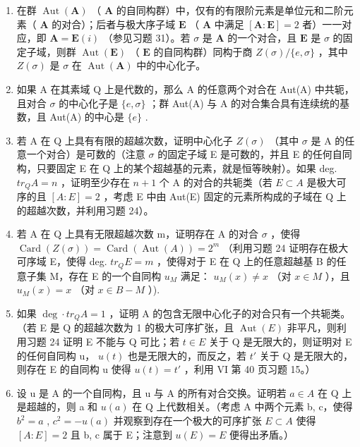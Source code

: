 \begin{enumerate}
\def\labelenumi{\alph{enumi})}
\item
  在群 \(\operatorname{Aut}(\mathbf{A})\) （ \(\mathbf{A}\) 的自同构群）中，仅有的有限阶元素是单位元和二阶元素（ \(\mathbf{A}\) 的对合）；后者与极大序子域 \(\mathbf{E}\) （ \(\mathbf{A}\) 中满足 \([\mathbf{A}:\mathbf{E}] = 2\) 者）一一对应，即 \(\mathbf{A} = \mathbf{E}(i)\) （参见习题 31）。若 \(\sigma\) 是 \(\mathbf{A}\) 的一个对合，且 \(\mathbf{E}\) 是 \(\sigma\) 的固定子域，则群 \(\operatorname{Aut}(\mathbf{E})\) （ \(\mathbf{E}\) 的自同构群）同构于商 \(Z(\sigma) / \{e, \sigma\}\) ，其中 \(Z(\sigma)\) 是 \(\sigma\) 在 \(\operatorname{Aut}(\mathbf{A})\) 中的中心化子。
\item
  如果 A 在其素域 Q 上是代数的，那么 A 的任意两个对合在 Aut(A) 中共轭，且对合 \(\sigma\) 的中心化子是 \(\{e, \sigma\}\) ；群 Aut(A) 与 A 的对合集合具有连续统的基数，且 Aut(A) 的中心是 \(\{e\}\) .
\item
  若 A 在 Q 上具有有限的超越次数，证明中心化子 \(Z(\sigma)\) （其中 \(\sigma\) 是 A 的任意一个对合）是可数的（注意 \(\sigma\) 的固定子域 E 是可数的，并且 E 的任何自同构，只要固定 E 在 Q 上的某个超越基的元素，就是恒等映射）。如果 deg. \(tr_{Q}A = n\) ，证明至少存在 \(n + 1\) 个 A 的对合的共轭类（若 \(E \subset A\) 是极大可序的且 \([A : E] = 2\) ，考虑 E 中由 Aut(E) 固定的元素所构成的子域在 Q 上的超越次数，并利用习题 24）。
\item
  若 A 在 Q 上具有无限超越次数 m，证明存在 A 的对合 \(\sigma\) ，使得 \(\operatorname{Card}(Z(\sigma)) = \operatorname{Card}(\operatorname{Aut}(A)) = 2^{m}\) （利用习题 24 证明存在极大可序域 E，使得 deg. \(tr_{Q}E = m\) ，使得对于 E 在 Q 上的任意超越基 B 的任意子集 M，存在 E 的一个自同构 \(u_{M}\) 满足： \(u_{M}(x) \neq x\) （对 \(x \in M\) ），且 \(u_{M}(x) = x\) （对 \(x \in B - M\) ）).
\item
  如果 \(\deg \cdot tr_{Q}A = 1\) ，证明 A 的包含无限中心化子的对合只有一个共轭类。（若 E 是 Q 的超越次数为 1 的极大可序扩张，且 \(\operatorname{Aut}(E)\) 非平凡，则利用习题 24 证明 E 不能与 Q 可比；若 \(t \in E\) 关于 Q 是无限大的，则证明对 E 的任何自同构 u， \(u(t)\) 也是无限大的，而反之，若 \(t'\) 关于 Q 是无限大的，则存在 E 的自同构 u 使得 \(u(t) = t'\) ，利用 VI 第 40 页习题 15。）
\item
  设 u 是 A 的一个自同构，且 u 与 A 的所有对合交换。证明若 \(a \in A\) 在 Q 上是超越的，则 a 和 \(u(a)\) 在 Q 上代数相关。（考虑 A 中两个元素 b, c，使得 \(b^{2} = a\) , \(c^{2} = -u(a)\) 并观察到存在一个极大的可序扩张 \(E \subset A\) 使得 \([A : E] = 2\) 且 b, c 属于 E；注意到 \(u(E) = E\) 便得出矛盾。）
\end{enumerate}

